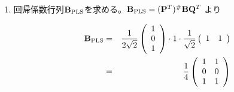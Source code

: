 \begin{enumerate}
\begin{enumerate}
\item 回帰係数行列\({\mathbf B}_{\rm PLS}\)を求める。\({\mathbf B}_{\rm PLS} = ({\mathbf P}^T)^\# {\mathbf B}{\mathbf Q}^T\) より

\begin{eqnarray*}
{\mathbf B}_{\rm PLS} & = & \frac{1}{2\sqrt{2}}
\left(
\begin{array}{c}
1 \\
0 \\
1 \\
\end{array}
\right) 
\cdot 1 \cdot 
\frac{1}{\sqrt{2}}
\left(
\begin{array}{cc}
1 & 1\\
\end{array}
\right) \\
& = & \frac{1}{4}
\left(
\begin{array}{cc}
1 & 1\\
0 & 0\\
1 & 1\\
\end{array}
\right) 
\end{eqnarray*}
\end{enumerate}


\end{enumerate}
